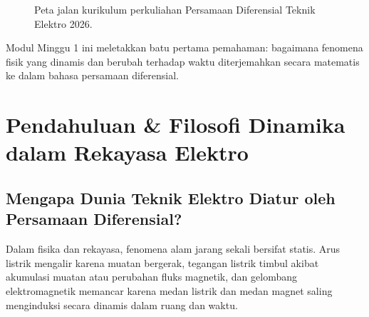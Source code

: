 \documentclass[11pt,a4paper]{article}
\theoremstyle{definition}
\begin{document}
\begin{figure}[htbp]
{%
}
\caption{Peta jalan kurikulum perkuliahan Persamaan Diferensial Teknik Elektro 2026.}
\label{fig:peta_jalan_pd}
\end{figure}

Modul Minggu 1 ini meletakkan batu pertama pemahaman: bagaimana fenomena fisik yang dinamis dan berubah terhadap waktu diterjemahkan secara matematis ke dalam bahasa persamaan diferensial.


\section{Pendahuluan \& Filosofi Dinamika dalam Rekayasa Elektro}

\subsection{Mengapa Dunia Teknik Elektro Diatur oleh Persamaan Diferensial?}
Dalam fisika dan rekayasa, fenomena alam jarang sekali bersifat statis. Arus listrik mengalir karena muatan bergerak, tegangan listrik timbul akibat akumulasi muatan atau perubahan fluks magnetik, dan gelombang elektromagnetik memancar karena medan listrik dan medan magnet saling menginduksi secara dinamis dalam ruang dan waktu.
\end{document}
